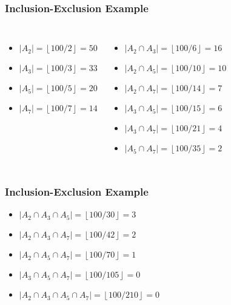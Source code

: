 \documentclass[dvipsnames]{beamer}
\begin{document}
\begin{frame}
  \frametitle{Inclusion-Exclusion Example}

  \begin{example}
    \begin{columns}[t]
      \begin{itemize}
        \item $|A_2| = \left\lfloor 100/2 \right\rfloor = 50$
        \item $|A_3| = \left\lfloor 100/3 \right\rfloor = 33$
        \item $|A_5| = \left\lfloor 100/5 \right\rfloor = 20$
        \item $|A_7| = \left\lfloor 100/7 \right\rfloor = 14$
      \end{itemize}

      \pause
      \begin{itemize}
        \item $|A_2 \cap A_3| = \left\lfloor 100/6  \right\rfloor = 16$
        \item $|A_2 \cap A_5| = \left\lfloor 100/10 \right\rfloor = 10$
        \item $|A_2 \cap A_7| = \left\lfloor 100/14 \right\rfloor = 7$
        \item $|A_3 \cap A_5| = \left\lfloor 100/15 \right\rfloor = 6$
        \item $|A_3 \cap A_7| = \left\lfloor 100/21 \right\rfloor = 4$
        \item $|A_5 \cap A_7| = \left\lfloor 100/35 \right\rfloor = 2$
      \end{itemize}
    \end{columns}
  \end{example}
\end{frame}

\begin{frame}
  \frametitle{Inclusion-Exclusion Example}

  \begin{example}
    \begin{itemize}
      \item $|A_2 \cap A_3 \cap A_5| = \left\lfloor 100/30  \right\rfloor = 3$
      \item $|A_2 \cap A_3 \cap A_7| = \left\lfloor 100/42  \right\rfloor = 2$
      \item $|A_2 \cap A_5 \cap A_7| = \left\lfloor 100/70  \right\rfloor = 1$
      \item $|A_3 \cap A_5 \cap A_7| = \left\lfloor 100/105 \right\rfloor = 0$
    \end{itemize}

    \pause
    \begin{itemize}
      \item $|A_2 \cap A_3 \cap A_5 \cap A_7| = \left\lfloor 100/210 \right\rfloor = 0$
    \end{itemize}
  \end{example}
\end{frame}
\end{document}
